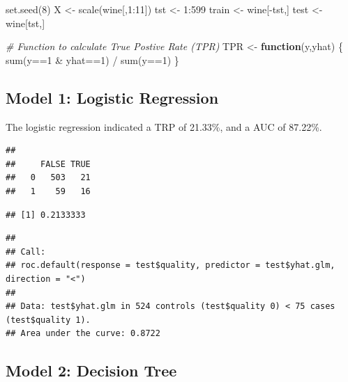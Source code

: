 \documentclass[
  english,
  man]{apa6}
\newenvironment{Shaded}{\begin{snugshade}}{\end{snugshade}}
\newcommand{\CommentTok}[1]{\textcolor[rgb]{0.56,0.35,0.01}{\textit{#1}}}
\newcommand{\ControlFlowTok}[1]{\textcolor[rgb]{0.13,0.29,0.53}{\textbf{#1}}}
\newcommand{\DecValTok}[1]{\textcolor[rgb]{0.00,0.00,0.81}{#1}}
\newcommand{\FunctionTok}[1]{\textcolor[rgb]{0.00,0.00,0.00}{#1}}
\newcommand{\NormalTok}[1]{#1}
\newcommand{\OtherTok}[1]{\textcolor[rgb]{0.56,0.35,0.01}{#1}}
\newcommand{\SpecialCharTok}[1]{\textcolor[rgb]{0.00,0.00,0.00}{#1}}
\begin{document}
\begin{Shaded}
\begin{Highlighting}[]
\FunctionTok{set.seed}\NormalTok{(}\DecValTok{8}\NormalTok{) }
\NormalTok{X }\OtherTok{\textless{}{-}} \FunctionTok{scale}\NormalTok{(wine[,}\DecValTok{1}\SpecialCharTok{:}\DecValTok{11}\NormalTok{])}
\NormalTok{tst }\OtherTok{\textless{}{-}} \DecValTok{1}\SpecialCharTok{:}\DecValTok{599}
\NormalTok{train }\OtherTok{\textless{}{-}}\NormalTok{ wine[}\SpecialCharTok{{-}}\NormalTok{tst,]}
\NormalTok{test }\OtherTok{\textless{}{-}}\NormalTok{ wine[tst,]}

\CommentTok{\# Function to calculate True Postive Rate (TPR)}
\NormalTok{TPR }\OtherTok{\textless{}{-}} \ControlFlowTok{function}\NormalTok{(y,yhat)  \{ }\FunctionTok{sum}\NormalTok{(y}\SpecialCharTok{==}\DecValTok{1} \SpecialCharTok{\&}\NormalTok{ yhat}\SpecialCharTok{==}\DecValTok{1}\NormalTok{) }\SpecialCharTok{/} \FunctionTok{sum}\NormalTok{(y}\SpecialCharTok{==}\DecValTok{1}\NormalTok{) \}}
\end{Highlighting}
\end{Shaded}

\hypertarget{model-1-logistic-regression}{%
\subsection{Model 1: Logistic Regression}\label{model-1-logistic-regression}}

The logistic regression indicated a TRP of 21.33\%, and a AUC of 87.22\%.

\begin{verbatim}
##    
##     FALSE TRUE
##   0   503   21
##   1    59   16
\end{verbatim}

\begin{verbatim}
## [1] 0.2133333
\end{verbatim}

\begin{verbatim}
## 
## Call:
## roc.default(response = test$quality, predictor = test$yhat.glm,     direction = "<")
## 
## Data: test$yhat.glm in 524 controls (test$quality 0) < 75 cases (test$quality 1).
## Area under the curve: 0.8722
\end{verbatim}

\hypertarget{model-2-decision-tree}{%
\subsection{Model 2: Decision Tree}\label{model-2-decision-tree}}
\end{document}
